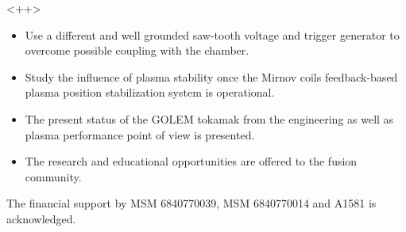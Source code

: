 \documentclass[portrait,final,a0paper]{baposter}
\def\bi{\begin{itemize}}
\def\ei{\end{itemize}}
\def\im{\item}
\begin{document}
\begin{poster}
 {
 }<++>
{
\begin{itemize}
    \item Use a different and well grounded saw-tooth voltage and trigger generator to overcome possible coupling with the chamber.
    \item Study the influence of plasma stability once the Mirnov coils feedback-based plasma position stabilization system is operational.
\end{itemize}
}
{
  \bi
    \im The present status of the GOLEM tokamak from the engineering as well as plasma performance point of view is presented.
    \im The research and educational opportunities are offered to the fusion community.
  \ei
}

{
  The financial support by MSM 6840770039,  MSM 6840770014 and A1581 is acknowledged.
  \vspace{0.5em}
}

{
  \nocite{FusenEngDes11}
  \nocite{Zara06}
    \smaller
    \vspace{-0.4em}
    
    \renewcommand{\section}[2]{\vskip 0.05em}
    
}

\end{poster}
\end{document}
